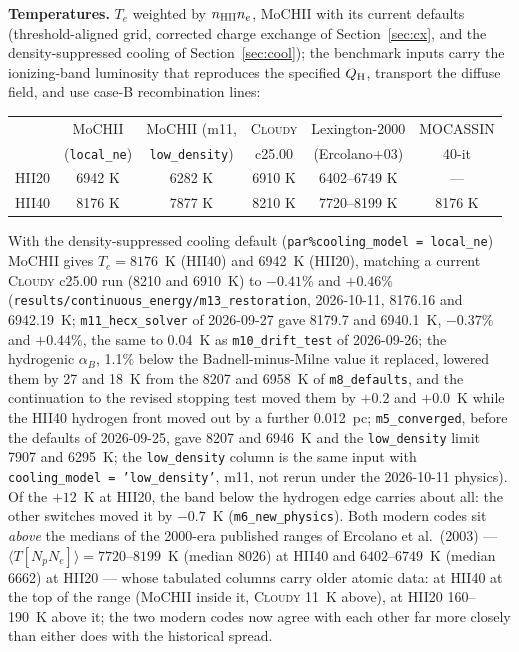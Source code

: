 \documentclass[english,a4paper]{my_memo}
\newcommand{\code}[1]{\texttt{#1}}
\begin{document}
\textbf{Temperatures.}  $T_e$ weighted by $n_{\rm HII} n_e$, MoCHII with
its current defaults (threshold-aligned grid, corrected charge exchange
of Section~\ref{sec:cx}, and the density-suppressed cooling of
Section~\ref{sec:cool}); the benchmark inputs carry the ionizing-band
luminosity that reproduces the specified $Q_{\rm H}$, transport the
diffuse field, and use case-B recombination lines:

\begin{center}\small
\begin{tabular}{lccccc}
\toprule
 & MoCHII & MoCHII (m11, & \textsc{Cloudy} & Lexington-2000 & MOCASSIN \\
 & (\code{local\_ne}) & \code{low\_density}) & c25.00 & (Ercolano+03) & 40-it \\
\midrule
HII20 & 6942 K & 6282 K & 6910 K & 6402--6749 K & --- \\
HII40 & 8176 K & 7877 K & 8210 K & 7720--8199 K & 8176 K \\
\bottomrule
\end{tabular}
\end{center}
With the density-suppressed cooling default (\code{par\%cooling\_model =
local\_ne}) MoCHII gives $T_e = 8176$~K (HII40) and 6942~K (HII20),
matching a current \textsc{Cloudy} c25.00 run (8210 and 6910~K) to
$-0.41\%$ and $+0.46\%$ (\code{results/continuous\_energy/m13\_restoration},
2026-10-11, 8176.16 and 6942.19~K; \code{m11\_hecx\_solver} of 2026-09-27
gave 8179.7 and 6940.1~K, $-0.37\%$ and $+0.44\%$, the same to 0.04~K as
\code{m10\_drift\_test} of 2026-09-26; the hydrogenic $\alpha_B$, 1.1\% below the Badnell-minus-Milne
value it replaced, lowered them by 27 and 18~K from the 8207 and 6958~K of
\code{m8\_defaults}, and the continuation to the revised stopping test
moved them by $+0.2$ and $+0.0$~K while the HII40 hydrogen front moved out
by a further 0.012~pc; \code{m5\_converged}, before the defaults of 2026-09-25, gave
8207 and 6946~K and the \code{low\_density} limit 7907 and 6295~K; the
\code{low\_density} column is the same input with
\code{cooling\_model = 'low\_density'}, m11, not rerun under the 2026-10-11
physics).  Of the $+12$~K at HII20, the
band below the hydrogen edge carries about all: the other switches moved
it by $-0.7$~K (\code{m6\_new\_physics}).  Both modern codes sit \emph{above} the medians of the
2000-era published ranges of Ercolano et al.\ (2003) ---
$\langle T[N_pN_e]\rangle = 7720$--$8199$~K (median 8026) at HII40 and
$6402$--$6749$~K (median 6662) at HII20 --- whose tabulated columns carry
older atomic data: at HII40 at the top of the range (MoCHII inside it,
\textsc{Cloudy} 11~K above), at HII20 160--190~K above it; the two modern codes now agree with each other far
more closely than either does with the historical spread.
\end{document}
